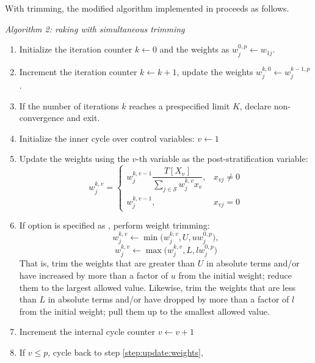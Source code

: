 With trimming, the modified algorithm implemented in
 proceeds as follows.


{\it Algorithm 2: raking with simultaneous trimming}

\begin{enumerate}
    \item Initialize the iteration counter $k\leftarrow 0$
          and the weights as $w_j^{0,p} \leftarrow w_{1j}$.
    \item Increment the iteration counter $k \leftarrow k+1$,
          update the weights $w_j^{k,0} \leftarrow w_j^{k-1,p}$.
          \label{step:next:cycle}
    \item If the number of iterations $k$ reaches a prespecified limit $K$,
          declare non-convergence and exit.
    \item Initialize the inner cycle over control variables: $v \leftarrow 1$
    \item Update the weights using the $v$-th variable
        as the post-stratification variable:
        $$
            w_j^{k,v} =
                \left\{
                \begin{array}{ll}
                    w_j^{k,v-1} \dfrac{ T[X_v] }{ \sum_{j \in \mathcal{S}} w_j^{k,v} x_v },
                        & x_{vj} \neq 0 \\
                    w_j^{k,v-1},
                        & x_{vj} = 0
                \end{array}
                \right.
          $$
          \label{step:update:weights}
    \item If  option is specified as ,
        perform weight trimming:
        $$
            w_j^{k,v} \leftarrow \min\bigl( w_j^{k,v}, U, u w_j^{0,p} \bigr),
        $$
        $$
            w_j^{k,v} \leftarrow \max\bigl( w_j^{k,v}, L, l w_j^{0,p} \bigr)
        $$
        \label{step:trimfreq:often}
        \noindent
        That is, trim the weights that are greater than $U$ in absolute terms and/or 
        have increased by more than a factor of $u$ from the initial weight; reduce them
        to the largest allowed value. Likewise, trim the weights that are less than $L$ 
        in absolute terms and/or have dropped by more than a factor of $l$ from the initial
        weight; pull them up to the smallest allowed value.
    \item Increment the internal cycle counter $v \leftarrow v+1$
    \item If $v \le p$, cycle back to step \ref{step:update:weights},

\end{enumerate}
